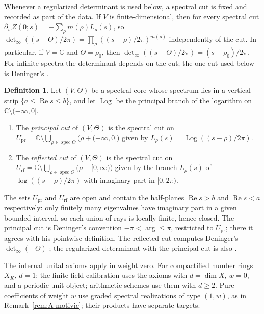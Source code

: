 \documentclass[11pt]{amsart}
\theoremstyle{plain}
\theoremstyle{definition}
\newtheorem{definition}[theorem]{Definition}
\theoremstyle{remark}
\numberwithin{equation}{section}
\newcommand{\C}{\mathbb{C}}
\newcommand{\Xbar}{\overline{X}}
\DeclareMathOperator{\spec}{spec}
\DeclareMathOperator{\Rea}{Re}
\newcommand{\detreg}{{\det}_{\infty}}
\renewcommand{\Re}{\Rea}
\begin{document}
Whenever a regularized determinant is used below, a spectral cut is
fixed and recorded as part of the data. If $V$ is
finite-dimensional, then for every spectral cut
$\partial_wZ(0;s)=-\sum_\rho m(\rho)L_\rho(s)$, so
$\detreg((s-\Theta)/2\pi)=\prod_\rho((s-\rho)/2\pi)^{m(\rho)}$
independently of the cut. In particular, if $V=\C$ and $\Theta=\rho_0$,
then $\detreg((s-\Theta)/2\pi)=(s-\rho_0)/2\pi$. For infinite spectra
the determinant depends on the cut; the one cut used below is Deninger's
\cite[(1.1), p.~3]{Deninger1994Motivic}.

\begin{definition}\label{def:principal-cut}
Let $(V,\Theta)$ be a spectral core whose spectrum lies in a vertical
strip $\{a\le\Re s\le b\}$, and let $\operatorname{Log}$ be the
principal branch of the logarithm on $\C\setminus(-\infty,0]$.
\begin{enumerate}[label=(\alph*)]
\item The \emph{principal cut} of $(V,\Theta)$ is the spectral cut on
  $U_{\mathrm{pr}}=\C\setminus\bigcup_{\rho\in\spec\Theta}
  \bigl(\rho+(-\infty,0]\bigr)$ given by
  $L_\rho(s)=\operatorname{Log}((s-\rho)/2\pi)$.
\item The \emph{reflected cut} of $(V,\Theta)$ is the spectral cut on
  $U_{\mathrm{rf}}=\C\setminus\bigcup_{\rho\in\spec\Theta}
  \bigl(\rho+[0,\infty)\bigr)$ given by the branch $L_\rho(s)$ of
  $\log((s-\rho)/2\pi)$ with imaginary part in $[0,2\pi)$.
\end{enumerate}
\end{definition}

The sets $U_{\mathrm{pr}}$ and $U_{\mathrm{rf}}$ are open and contain
the half-planes $\Re s>b$ and $\Re s<a$ respectively: only finitely many
eigenvalues have imaginary part in a given bounded interval, so each
union of rays is locally finite, hence closed. The principal cut is
Deninger's convention $-\pi<\arg\le\pi$, restricted to
$U_{\mathrm{pr}}$; there it agrees with his pointwise definition.
The reflected cut computes Deninger's $\detreg(-\Theta)$
\cite[(1.3)--(1.7), pp.~4--6]{Deninger1994Motivic}; the regularized
determinant with the principal cut is also
\cite[Definition~2.1, p.~521]{FlachMorin2020DeningerWeilArakelov}.

The internal unital axioms apply in weight zero. For compactified
number rings $\Xbar_K$, $d=1$; the finite-field calibration uses the
axioms with $d=\dim X$, $w=0$, and a periodic unit object; arithmetic
schemes use them with $d\ge2$. Pure coefficients of weight $w$ use
graded spectral realizations of type $(1,w)$, as in
Remark~\ref{rem:A-motivic}; their products have separate targets.
\end{document}
